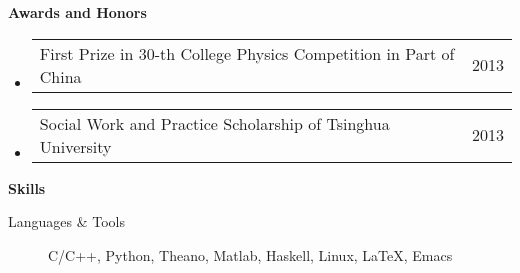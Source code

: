 \documentclass[letterpaper,11pt]{article}
\makeatletter
\newcommand{\resheading}[1]{{\large \colorbox{mygrey}{\begin{minipage}{\textwidth}{\textbf{#1 \vphantom{p\^{E}}}}\end{minipage}}}}
\newcommand{\ressubsubheadingni}[2]{
  \begin{tabular*}{6.5in}{l@{\extracolsep{\fill}}r}
	#1 & #2 \\
  \end{tabular*}\vspace{-7pt}}
\makeatother
\begin{document}
\resheading{Awards and Honors}
\begin{itemize}
\item\ressubsubheadingni{First Prize in 30-th College Physics Competition in Part of China}{2013}
\item\ressubsubheadingni{Social Work and Practice Scholarship of Tsinghua University}{2013}
\end{itemize}

\resheading{Skills}
\begin{description}
\item[Languages \& Tools] {C/C++, Python, Theano, Matlab, Haskell, Linux, \LaTeX, Emacs}
\end{description} %


\begin{comment}
  \resheading{Standardized Tests}
  \begin{description}
  \item[TOEFL] {R: 30, L: 29, S: 23, W: 25, Total:107}
  \item[GRE] {V: 156, Q: 170, AW: 3.5}
  \end{description}
\end{comment}
\end{document}

